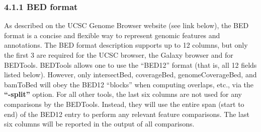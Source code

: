 \documentclass[letterpaper,10pt,english]{sphinxmanual}
\begin{document}
\subsubsection{4.1.1 BED format}
\label{content/general-usage:bed-format}
As described on the UCSC Genome Browser website (see link below), the BED format is a concise and
flexible way to represent genomic features and annotations. The BED format description supports up to
12 columns, but only the first 3 are required for the UCSC browser, the Galaxy browser and for
BEDTools. BEDTools allows one to use the ``BED12'' format (that is, all 12 fields listed below).
However, only intersectBed, coverageBed, genomeCoverageBed, and bamToBed will obey the BED12
``blocks'' when computing overlaps, etc., via the \textbf{``-split''} option. For all other tools, the last six columns
are not used for any comparisons by the BEDTools. Instead, they will use the entire span (start to end)
of the BED12 entry to perform any relevant feature comparisons. The last six columns will be reported
in the output of all comparisons.
\end{document}
